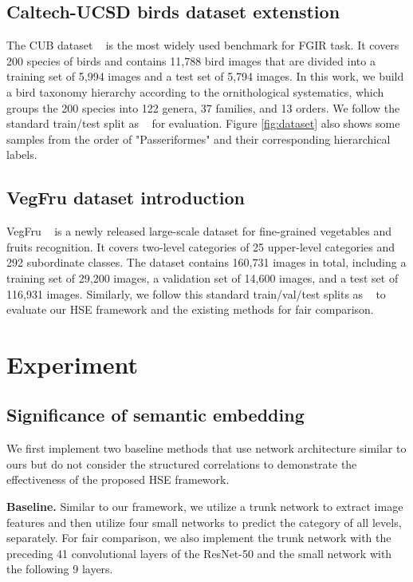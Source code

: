 \documentclass[sigconf]{acmart}
\begin{document}
\subsection{Caltech-UCSD birds dataset extenstion}
The CUB dataset ~\cite{wah2011caltech} is the most widely used benchmark for FGIR task. It covers 200 species of birds and contains 11,788 bird images that are divided into a training set of 5,994 images and a test set of 5,794 images. In this work, we build a bird taxonomy hierarchy according to the ornithological systematics, which groups the 200 species into 122 genera, 37 families, and 13 orders. We follow the standard train/test split as ~\cite{wah2011caltech} for evaluation. Figure \ref{fig:dataset} also shows some samples from the order of "Passeriformes" and their corresponding hierarchical labels.

\subsection{VegFru dataset introduction}
VegFru ~\cite{hou2017vegfru} is a newly released large-scale dataset for fine-grained vegetables and fruits recognition. It covers two-level categories of 25 upper-level categories and 292 subordinate classes. The dataset contains 160,731 images in total, including a training set of 29,200 images, a validation set of 14,600 images, and a test set of 116,931 images. Similarly, we follow this standard train/val/test splits as ~\cite{hou2017vegfru} to evaluate our HSE framework and the existing methods for fair comparison. 

\section{Experiment}

\subsection{Significance of semantic embedding}
We first implement two baseline methods that use network architecture similar to ours but do not consider the structured correlations to demonstrate the effectiveness of the proposed HSE framework. 

\noindent\textbf{Baseline. }Similar to our framework, we utilize a trunk network to extract image features and then utilize four small networks to predict the category of all levels, separately. For fair comparison, we also implement the trunk network with the preceding 41 convolutional layers of the ResNet-50 and the small network with the following 9 layers.
\end{document}
